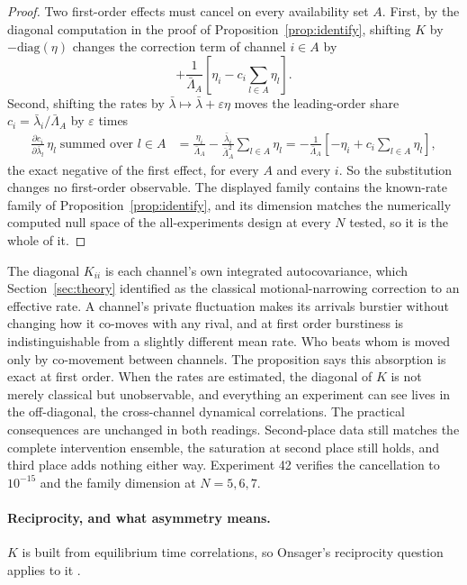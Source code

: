 \documentclass[11pt]{article}
\theoremstyle{remark}
\newcommand{\lbar}{\bar{\lambda}}
\begin{document}
\begin{proof}
Two first-order effects must cancel on every availability set $A$. First, by
the diagonal computation in the proof of Proposition~\ref{prop:identify},
shifting $K$ by $-\mathrm{diag}(\eta)$ changes the correction term of
channel $i \in A$ by
\[
  +\frac{1}{\bar\Lambda_A}
  \left[\eta_i - c_i \sum_{l\in A}\eta_l\right].
\]
Second, shifting the rates by $\lbar \mapsto \lbar + \varepsilon\eta$
moves the leading-order share $c_i = \lbar_i / \bar\Lambda_A$ by
$\varepsilon$ times
\begin{align*}
  \frac{\partial c_i}{\partial \lbar_l}\,\eta_l \;\text{summed over }
  l \in A
  &= \frac{\eta_i}{\bar\Lambda_A}
    - \frac{\lbar_i}{\bar\Lambda_A^2} \sum_{l\in A}\eta_l
  = -\frac{1}{\bar\Lambda_A}
    \left[ -\eta_i + c_i \sum_{l\in A}\eta_l\right],
\end{align*}
the exact negative of the first effect, for every $A$ and every $i$. So the
substitution changes no first-order observable. The displayed family contains
the known-rate family of Proposition~\ref{prop:identify}, and its dimension
matches the numerically computed null space of the all-experiments design at
every $N$ tested, so it is the whole of it.
\end{proof}

The diagonal $K_{ii}$ is each channel's own
integrated autocovariance, which Section~\ref{sec:theory} identified as the
classical motional-narrowing correction to an effective rate. A channel's
private fluctuation makes its arrivals burstier without changing how it
co-moves with any rival, and at first order burstiness is indistinguishable
from a slightly different mean rate. Who beats whom is moved only by
co-movement between channels. The proposition says this absorption is exact
at first order. When the rates are estimated,
the diagonal of $K$ is not merely classical but unobservable, and everything
an experiment can see lives in the off-diagonal, the cross-channel dynamical
correlations. The practical consequences are unchanged in both readings.
Second-place data still matches the complete intervention ensemble, the
saturation at second place still holds, and third place adds nothing either
way. Experiment 42 verifies the cancellation to $10^{-15}$ and the family
dimension at $N = 5, 6, 7$.

\paragraph{Reciprocity, and what asymmetry means.} $K$ is built from
equilibrium time correlations, so Onsager's reciprocity question applies to
it \citep{onsager1931}.
\end{document}
